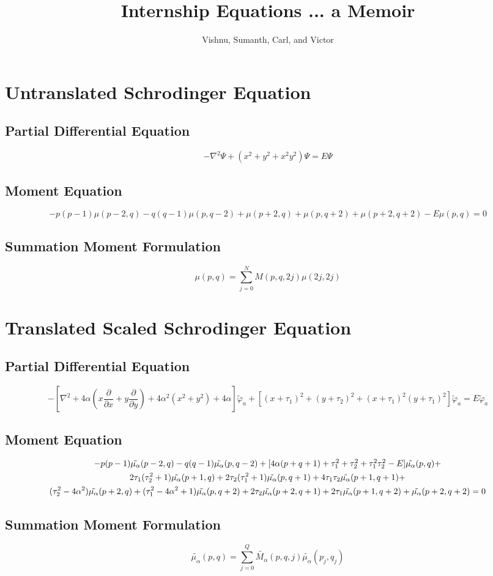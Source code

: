 \documentclass[letterpaper]{article}
\title{Internship Equations ... a Memoir}
\author{Vishnu, Sumanth, Carl, and Victor}
\begin{document}
	\maketitle
	\newpage
	\tableofcontents
	\newpage
	\section{Untranslated Schrodinger Equation}
	\subsection{Partial Differential Equation}
	\begin{equation*}
		-{\nabla}^2\Psi+(x^2+y^2+x^2y^2)\Psi=E\Psi
	\end{equation*}
	\subsection{Moment Equation}
	\begin{equation*}
		-p(p-1)\mu(p-2,q)-q(q-1)\mu(p,q-2)+\mu(p+2,q)+\mu(p,q+2)+\mu(p+2,q+2)-E\mu(p,q)=0
	\end{equation*}
	\subsection{Summation Moment Formulation}
	\begin{equation*}
		\mu(p,q)=\sum_{j=0}^N M(p,q,2j)\mu(2j,2j)
	\end{equation*}
	\section{Translated Scaled Schrodinger Equation}
	\subsection{Partial Differential Equation}
	\begin{equation*}
		-[{\nabla}^2+4\alpha(x\frac{\partial}{\partial x}+y\frac{\partial}{\partial y})+4{\alpha}^2(x^2+y^2)+4\alpha]\tilde{\varphi}_a +[(x+{\tau}_1)^2+(y+{\tau}_2)^2+(x+{\tau}_1)^2(y+{\tau}_1)^2]\tilde{\varphi}_a=E\tilde{\varphi}_a
	\end{equation*}
	\subsection{Moment Equation}
	\begin{multline*}
		$$-p(p-1)\tilde{\mu_\alpha}(p-2,q)-q(q-1)\tilde{\mu_\alpha}(p,q-2)+[4\alpha(p+q+1)+\tau_1^2+\tau_2^2+\tau_1^2\tau_2^2-E]\tilde{\mu_\alpha}(p,q)+\\2\tau_1(\tau_2^2+1)\tilde{\mu_\alpha}(p+1,q)+2\tau_2(\tau_1^2+1)\tilde{\mu_\alpha}(p,q+1)+4\tau_1\tau_2\tilde{\mu_\alpha}(p+1,q+1)+\\(\tau_2^2-4\alpha^2)\tilde{\mu_\alpha}(p+2,q)+(\tau_1^2-4\alpha^2+1)\tilde{\mu_\alpha}(p,q+2)+2\tau_2\tilde{\mu_\alpha}(p+2,q+1)+2\tau_1\tilde{\mu_\alpha}(p+1,q+2)+\tilde{\mu_\alpha}(p+2,q+2)=0$$
	\end{multline*}
	\subsection{Summation Moment Formulation}
	\begin{equation*}
		\tilde{\mu_\alpha}(p,q)=\sum_{j=0}^Q\tilde{M_\alpha}(p,q,j)\tilde{\mu_\alpha}(p_j,q_j)
	\end{equation*}
\end{document}
